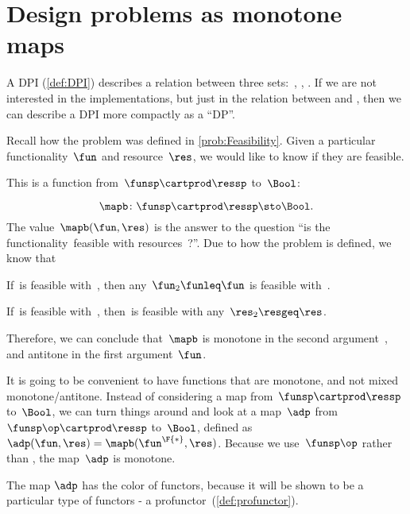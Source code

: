 
\section[DPs as monotone maps]{Design problems as monotone maps}
\label{sec:dpdefinition}


A DPI (\cref{def:DPI}) describes a relation between three sets:~\funsp, \ressp, \impsp.
If we are not interested in the implementations, but just in the relation between \funsp and \ressp, then we can describe a DPI more compactly as a ``DP''\@.

Recall how the problem \Feasibility was defined in \cref{prob:Feasibility}.
Given a particular functionality~$\fun$ and resource~$\res$, we would like to know if they are feasible.

This is a function from~$\funsp \cartprod \ressp$ to~$\Bool$:

\begin{equation}
    \mapb\colon \funsp \cartprod \ressp \sto \Bool.
\end{equation}
%
The value~$\mapb(\fun, \res)$ is the answer to the question ``is the functionality~\fun feasible with resources~\res?''.
Due to how the problem is defined, we know that%
\begin{compactenum}
    \item If~\fun is feasible with~\res, then any~$\fun_2 \funleq \fun$ is feasible with~\res.
    \item If~\fun is feasible with~\res, then~\fun is feasible with any~$\res_2 \resgeq \res$.
\end{compactenum}
Therefore, we can conclude that~$\mapb$ is monotone in the second argument~\res, and antitone in the first argument~$\fun$.

It is going to be convenient to have functions that are monotone, and not mixed monotone/antitone.
Instead of considering a map from~$\funsp \cartprod \ressp$ to~$\Bool$, we can turn things around and look at a map~$\adp$ from~$\funsp\op \cartprod \ressp$ to~$\Bool$, defined as~$\adp(\fun,\res) = \mapb(\fun^\F{*},\res)$.
Because we use~$\funsp\op$ rather than \funsp, the map~$\adp$ is monotone.

\begin{remark}[Spoilers]
    The map $\adp$ has the color of functors, because it will be shown to be a particular type of functors - a profunctor~(\cref{def:profunctor}).
\end{remark}

